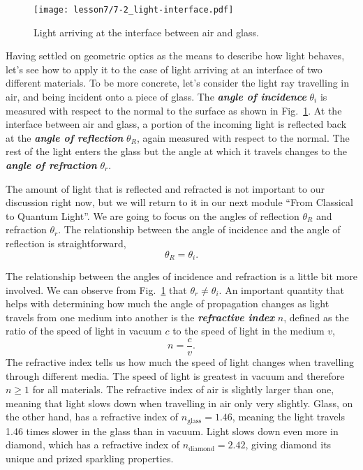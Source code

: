 \begin{figure}[t]
    \centering
    \texttt{[image: lesson7/7-2\_light-interface.pdf]}
    \caption[Angle of incidence]{Light arriving at the interface between air and glass.}
    \label{fig:7-2_interface}
\end{figure}

Having settled on geometric optics as the means to describe how light behaves, let's see how to apply it to the case of light arriving at an interface of two different materials.
To be more concrete, let's consider the light ray travelling in air, and being incident onto a piece of glass.
The \textbf{\emph{angle of incidence}} $\theta_i$ is measured with respect to the normal to the surface as shown in Fig.~\ref{fig:7-2_interface}.
At the interface between air and glass, a portion of the incoming light is reflected back at the \textbf{\emph{angle of reflection}} $\theta_R$, again measured with respect to the normal.
The rest of the light enters the glass but the angle at which it travels changes to the \textbf{\emph{angle of refraction}} $\theta_r$.

The amount of light that is reflected and refracted is not important to our discussion right now, but we will return to it in our next module ``From Classical to Quantum Light''.
We are going to focus on the angles of reflection $\theta_R$ and refraction $\theta_r$.
The relationship between the angle of incidence and the angle of reflection is straightforward,
\begin{equation}
    \theta_R = \theta_i.
\end{equation}

The relationship between the angles of incidence and refraction is a little bit more involved.
We can observe from Fig.~\ref{fig:7-2_interface} that $\theta_r \neq \theta_i$.
An important quantity that helps with determining how much the angle of propagation changes as light travels from one medium into another is the \textbf{\emph{refractive index}} $n$, defined as the ratio of the speed of light in vacuum $c$ to the speed of light in the medium $v$,
\begin{equation}
    n = \frac{c}{v}.
    \label{eq:7-2_refractive_index}
\end{equation}
The refractive index tells us how much the speed of light changes when travelling through different media.
The speed of light is greatest in vacuum and therefore $n\geq 1$ for all materials.
The refractive index of air is slightly larger than one, meaning that light slows down when travelling in air only very slightly.
Glass, on the other hand, has a refractive index of $n_{\text{glass}} = 1.46$, meaning the light travels 1.46 times slower in the glass than in vacuum.
Light slows down even more in diamond, which has a refractive index of $n_{\text{diamond}} = 2.42$, giving diamond its unique and prized sparkling properties.

